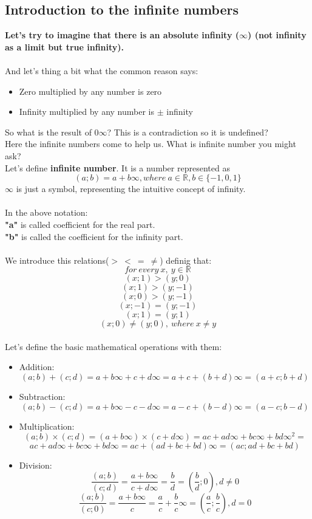 \documentclass[]{article}
\begin{document}
		\subsection{Introduction to the infinite numbers}
			\large{\textbf{Let's try to imagine that there is an absolute infinity ($\infty$) (not infinity as a limit but true infinity).}} \\\\
			And let's thing a bit what the common reason says:
			\begin{itemize}
				\item Zero multiplied by any number is zero
				\item Infinity multiplied by any number is $\pm$ infinity
			\end{itemize}
			So what is the result of $0\infty$? This is a contradiction so it is undefined? \\
			Here the infinite numbers come to help us. What is infinite number you might ask? \\
			Let's define \textbf{infinite number}. It is a number represented as
			$$(a; b) = a + b\infty, where\ a \in \mathbb{R}, b \in \{-1, 0, 1\}$$
			\textbf{$\infty$} is just a symbol, representing the intuitive concept of infinity.\\\\
			In the above notation:\\
			\textbf{"a"} is called coefficient for the real part.\\
			\textbf{"b"} is called the coefficient for the infinity part.\\\\
			We introduce this relations($>\ <\ =\ \neq$) definig that:\\
			$$for\ every\ x,\ y \in \mathbb{R}$$
			$$(x; 1) > (y; 0)$$
			$$(x; 1) > (y; -1)$$
			$$(x; 0) > (y; -1)$$
			$$(x; -1) = (y; -1)$$
			$$(x; 1) = (y; 1)$$
			$$(x; 0) \neq (y; 0),\ where\ x \neq y$$\\
			\newpage
			Let's define the basic mathematical operations with them:
			\begin{itemize}
				\item Addition: $$(a; b) + (c; d) = a + b\infty + c + d\infty = a + c + (b + d)\infty = (a + c; b + d)$$
				\item Subtraction: $$(a; b) - (c; d) = a + b\infty - c - d\infty = a - c + (b - d)\infty = (a - c; b - d)$$
				\item Multiplication: $$(a; b) \times (c; d) = (a + b\infty) \times (c + d\infty) = ac + ad\infty + bc\infty + bd{\infty}^2 =$$$$ ac + ad\infty + bc\infty + bd\infty = ac + (ad + bc + bd)\infty = (ac; ad + bc + bd)$$
				\item Division: $$\frac{(a; b)}{(c; d)} = \frac{a + b\infty}{c + d\infty} = \frac{b}{d} = (\frac{b}{d}; 0) , d \neq 0$$
				                $$\frac{(a; b)}{(c; 0)} = \frac{a + b\infty}{c} = \frac{a}{c} + \frac{b}{c}\infty = (\frac{a}{c}; \frac{b}{c}) , d = 0$$
     		\end{itemize}
\end{document}
